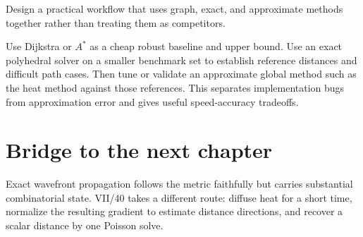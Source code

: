 \begin{problem}\label{prob:vii39-ch05}
Design a practical workflow that uses graph, exact, and approximate methods together rather than treating them as competitors.
\end{problem}

\begin{solution}
Use Dijkstra or \(A^\ast\) as a cheap robust baseline and upper bound.  Use an exact polyhedral solver on a smaller benchmark set to establish reference distances and difficult path cases.  Then tune or validate an approximate global method such as the heat method against those references.  This separates implementation bugs from approximation error and gives useful speed-accuracy tradeoffs.
\end{solution}

\section{Bridge to the next chapter}

Exact wavefront propagation follows the metric faithfully but carries substantial
combinatorial state.  VII/40 takes a different route: diffuse heat for a short
time, normalize the resulting gradient to estimate distance directions, and
recover a scalar distance by one Poisson solve.

